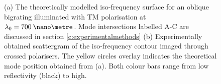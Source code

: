 \begin{figure}
	\begin{center}
	\end{center}
	\caption[The modelled and experimental iso-frequency surface for an oblique bigrating illuminated with TM polarisation at $\lambda_0=700\:\nano\metre$.]{(a) The theoretically modelled iso-frequency surface for an oblique bigrating illuminated with TM polarisation at $\lambda_0=700\:\nano\metre$. Mode intersections labelled A-C are discussed in section \ref{c:experimentalmethods} (b) Experimentally obtained scattergram of the iso-frequency contour imaged through crossed polarisers. The yellow circles overlay indicates the theoretical mode position obtained from (a). Both colour bars range from low reflectivity (black) to high.\label{fig:oblique-chandezon-exp-comparison}}
\end{figure}

